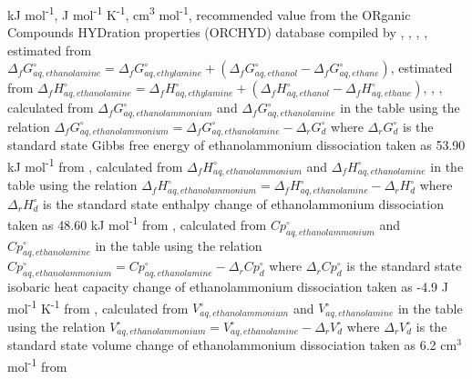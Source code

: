 {\begin{table}
\begin{threeparttable}
  \begin{tablenotes}
     kJ mol\textsuperscript{-1},
     J mol\textsuperscript{-1} K\textsuperscript{-1},
     cm\textsuperscript{3} mol\textsuperscript{-1},
     recommended value from the ORganic Compounds HYDration properties (ORCHYD) database compiled by \cite{plyasunova2004database},
     \cite{ben1984solvation},
     \cite{pliego2000new},
     \cite{shock1990calculation},
     estimated from $\Delta_{f}G^{\circ}_{aq, ethanolamine} = \Delta_{f}G^{\circ}_{aq, ethylamine} + (\Delta_{f}G^{\circ}_{aq, ethanol} - \Delta_{f}G^{\circ}_{aq, ethane})$,
     estimated from $\Delta_{f}H^{\circ}_{aq, ethanolamine} = \Delta_{f}H^{\circ}_{aq, ethylamine} + (\Delta_{f}H^{\circ}_{aq, ethanol} - \Delta_{f}H^{\circ}_{aq, ethane})$,
     \cite{cabani1981group},
     \cite{maham1994densities},
     calculated from $\Delta_{f}G^{\circ}_{aq, ethanolammonium}$ and  $\Delta_{f}G^{\circ}_{aq, ethanolamine}$ in the table using the relation $\Delta_{f}G^{\circ}_{aq, ethanolammonium} = \Delta_{f}G^{\circ}_{aq, ethanolamine} - \Delta_{r}G^{\circ}_{d}$ where $\Delta_{r}G^{\circ}_{d}$ is the standard state Gibbs free energy of ethanolammonium dissociation taken as 53.90 kJ mol\textsuperscript{-1} from \cite{hamborg2009dissociation},
     calculated from $\Delta_{f}H^{\circ}_{aq, ethanolammonium}$ and  $\Delta_{f}H^{\circ}_{aq, ethanolamine}$ in the table using the relation $\Delta_{f}H^{\circ}_{aq, ethanolammonium} = \Delta_{f}H^{\circ}_{aq, ethanolamine} - \Delta_{r}H^{\circ}_{d}$ where $\Delta_{r}H^{\circ}_{d}$ is the standard state enthalpy change of ethanolammonium dissociation taken as 48.60 kJ mol\textsuperscript{-1} from \cite{hamborg2009dissociation},
     calculated from $Cp^{\circ}_{aq, ethanolammonium}$ and $Cp^{\circ}_{aq, ethanolamine}$ in the table using the relation $Cp^{\circ}_{aq, ethanolammonium} = Cp^{\circ}_{aq, ethanolamine} - \Delta_{r}Cp^{\circ}_{d}$ where $\Delta_{r}Cp^{\circ}_{d}$ is the standard state isobaric heat capacity change of ethanolammonium dissociation taken as -4.9 J mol\textsuperscript{-1} K\textsuperscript{-1} from \cite{bates1951acidic},
     calculated from $V^{\circ}_{aq, ethanolammonium}$ and $V^{\circ}_{aq, ethanolamine}$ in the table using the relation $V^{\circ}_{aq, ethanolammonium} = V^{\circ}_{aq, ethanolamine} - \Delta_{r}V^{\circ}_{d}$ where $\Delta_{r}V^{\circ}_{d}$ is the standard state volume change of ethanolammonium dissociation taken as 6.2 cm$^3$ mol\textsuperscript{-1} from \cite{cabani1977volume}
        

\end{tablenotes}
\end{threeparttable}
\end{table}}
